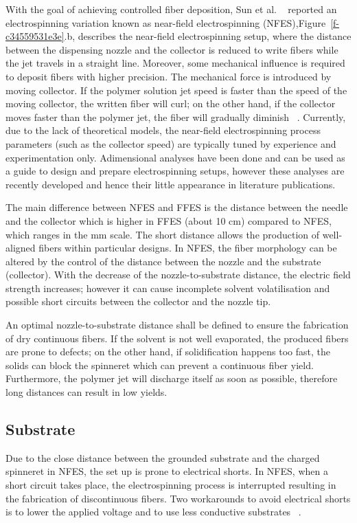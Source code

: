 With the goal of achieving controlled fiber deposition, Sun et al. \unskip~\cite{527120:11974321} reported an electrospinning variation known as near-field electrospinning (NFES),Figure~\ref{f-c34559531e3e}.b, describes the near-field electrospinning setup, where the distance between the dispensing nozzle and the collector is reduced to write fibers while the jet travels in a straight line. Moreover, some mechanical influence is required to deposit fibers with higher precision. The mechanical force is introduced by moving collector. If the polymer solution jet speed is faster than the speed of the moving collector, the written fiber will curl; on the other hand, if the collector moves faster than the polymer jet, the fiber will gradually diminish \unskip~\cite{527120:11974327,527120:11974326}. Currently, due to the lack of theoretical models, the near-field electrospinning process parameters (such as the collector speed) are typically tuned by experience and experimentation only. Adimensional analyses have been done \cite{Sarkar2009,Tourlomousis2017,Cai2013,Wang2008a,Widartiningsih2020,Chang2014,Brooks2015,Helgeson2008,Helgeson2007,Gadkari2014} and can be used as a guide to design and prepare electrospinning setups, however these analyses are recently developed and hence their little appearance in literature publications.

The main difference between NFES and FFES is the distance between the needle and the collector which is higher in FFES (about 10 cm) compared to NFES, which ranges in the mm scale. The short distance allows the production of well-aligned fibers within particular designs. In NFES, the fiber morphology can be altered by the control of the distance between the nozzle and the substrate (collector). With the decrease of the nozzle-to-substrate distance, the electric field strength increases; however it can cause incomplete solvent volatilisation and possible short circuits between the collector and the nozzle tip.

An optimal nozzle-to-substrate distance shall be defined to ensure the fabrication of dry continuous fibers. If the solvent is not well evaporated, the produced fibers are prone to defects; on the other hand, if solidification happens too fast, the solids can block the spinneret which can prevent a continuous fiber yield. Furthermore, the polymer jet will discharge itself as soon as possible, therefore long distances can result in low yields.

\subsection{Substrate}Due to the close distance between the grounded substrate and the charged spinneret in NFES, the set up is prone to electrical shorts. In NFES, when a short circuit takes place, the electrospinning process is interrupted resulting in the fabrication of discontinuous fibers. Two workarounds to avoid electrical shorts is to lower the applied voltage and to use less conductive substrates \unskip~\cite{527120:11974315,527120:12322289}.

